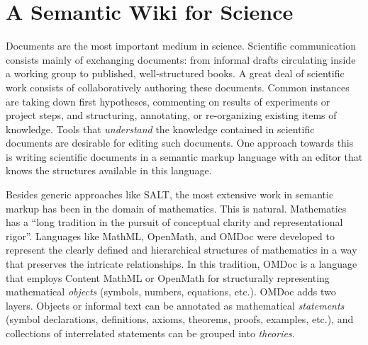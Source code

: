 \section{A Semantic Wiki for Science}
\label{sec:science}

\begin{figure}
  \centering
  \vspace{-.9cm}
  \vspace{-1.2cm}
\end{figure}
Documents are the most important medium in science.
Scientific
communication consists mainly of exchanging documents: from informal drafts circulating
inside a working group to published, well-structured books.  A great deal of scientific
work consists of collaboratively authoring these documents. 
Common instances are taking down first hypotheses,
commenting on results of experiments or project steps, and structuring, annotating,
or re-organizing existing items of knowledge.  Tools that
\emph{understand} the knowledge contained in scientific documents are desirable for
editing such documents.  One approach towards this is writing scientific documents in a
semantic markup language with an editor that knows the structures available in this
language.

Besides generic approaches like SALT\cite{Groza:SALT07}, the most extensive work
in semantic markup has been in the domain of mathematics.  This is natural.
Mathematics has a ``long tradition in the pursuit of conceptual clarity and
representational rigor''\cite{Kohlhase:omdoc1.2}.  Languages like
MathML\cite{CarlisleEd:MathML07}, OpenMath\cite{BusCapCar:2oms04}, and
OMDoc\cite{Kohlhase:omdoc1.2} were developed to represent the clearly defined
and hierarchical structures of mathematics in a way that preserves the intricate
relationships.  In this tradition, OMDoc is a language that employs Content
MathML or OpenMath for structurally representing mathematical \emph{objects}
(symbols, numbers, equations, etc.).  OMDoc adds two layers.  Objects or
informal text can be annotated as mathematical \emph{statements} (symbol
declarations, definitions, axioms, theorems, proofs, examples, etc.), and
collections of interrelated statements can be grouped into \emph{theories}.

